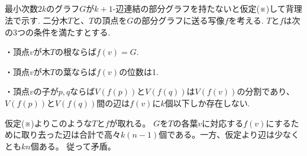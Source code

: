 \subsection{}
最小次数$2k$のグラフ$G$が$k+1$-辺連結の部分グラフを持たないと仮定(※)して背理法で示す.
二分木$T$と、$T$の頂点を$G$の部分グラフに送る写像$f$を考える.
$T$と$f$は次の3つの条件を満たすとする.

・頂点$v$が木$T$の根ならば$f(v)=G$.

・頂点$v$が木$T$の葉ならば$f(v)$の位数は1.

・頂点$v$の子が$p,q$ならば$V(f(p))$と$V(f(q))$は$V(f(v))$の分割であり、$V(f(p))$と$V(f(q))$間の辺は$f(v)$に$k$個以下しか存在しない.

仮定(※)よりこのような$T$と$f$が取れる。
$G$を$T$の各葉$v$に対応する$f(v)$にするために取り去った辺は合計で高々$k(n-1)$個である。一方、仮定より辺は少なくとも$kn$個ある。
従って矛盾。
